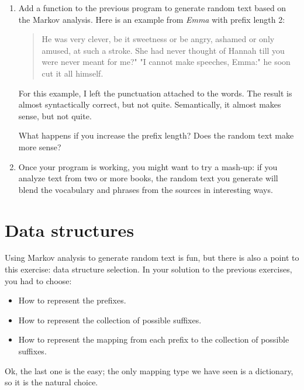 \documentclass[10pt]{book}
\begin{document}
{\begin{ex}
\begin{enumerate}
\item Add a function to the previous program to generate random text
based on the Markov analysis.  Here is an example from {\em Emma}
with prefix length 2:

\begin{quote}
He was very clever, be it sweetness or be angry, ashamed or only
amused, at such a stroke. She had never thought of Hannah till you
were never meant for me?" "I cannot make speeches, Emma:" he soon cut
it all himself.
\end{quote}

For this example, I left the punctuation attached to the words.
The result is almost syntactically correct, but not quite.
Semantically, it almost makes sense, but not quite.

What happens if you increase the prefix length?  Does the random
text make more sense?


\item Once your program is working, you might want to try a mash-up:
if you analyze text from two or more books, the random
text you generate will blend the vocabulary and phrases from
the sources in interesting ways.

\end{enumerate}
\end{ex}


\section{Data structures}


Using Markov analysis to generate random text is fun, but there is
also a point to this exercise: data structure selection.  In your
solution to the previous exercises, you had to choose:

\begin{itemize}

\item How to represent the prefixes.

\item How to represent the collection of possible suffixes.

\item How to represent the mapping from each prefix to
the collection of possible suffixes.

\end{itemize}

Ok, the last one is the easy; the only mapping type we have
seen is a dictionary, so it is the natural choice.

}
\end{document}
